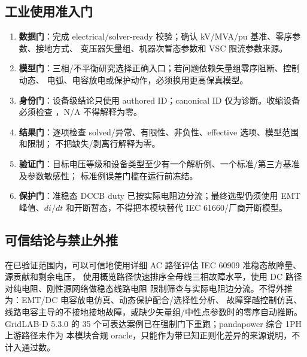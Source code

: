 \subsection{工业使用准入门}

\begin{enumerate}
  \item \textbf{数据门}：完成 electrical/solver-ready 校验；确认 kV/MVA/pu 基准、零序参数、接地方式、
        变压器矢量组、机器次暂态参数和 VSC 限流参数来源。
  \item \textbf{模型门}：三相/不平衡研究选择正确入口；若问题依赖矢量组零序阻断、控制动态、
        电弧、电容放电或保护动作，必须换用更高保真模型。
  \item \textbf{身份门}：设备级结论只使用 authored ID；canonical ID 仅为诊断。收缩设备必须检查
        ，N/A 不得解释为零。
  \item \textbf{结果门}：逐项检查 solved/异常、有限性、非负性、effective 选项、模型范围和限制；
        不把缺失/剥离行解释为零。
  \item \textbf{验证门}：目标电压等级和设备类型至少有一个解析例、一个标准/第三方基准及参数敏感性；
        标准例误差门槛在运行前冻结。
  \item \textbf{保护门}：准稳态 DCCB duty 已按实际电阻边分流；最终选型仍须使用 EMT 峰值、$di/dt$
        和开断暂态，不得把本模块替代 IEC 61660/厂商开断模型。
\end{enumerate}

\subsection{可信结论与禁止外推}

在已验证范围内，可以可信地使用详细 AC 路径评估 IEC 60909 准稳态故障量、源贡献和剩余电压，
使用概览路径快速排序全母线三相故障水平，使用 DC 路径对纯电阻、刚性源网络做稳态线路电阻
限制筛查与实际电阻边分流。不得外推为：EMT/DC 电容放电仿真、动态保护配合/选择性分析、
故障穿越控制仿真、线路电容主导的不接地接地故障，或缺少矢量组/中性点参数时的零序自动推断。
GridLAB-D 5.3.0 的 35 个可表达案例已在强制门下重跑；pandapower 综合 1PH 上游路径未作为
本模块合规 oracle，只能作为带已知正则化差异的来源说明，不计入通过数。
